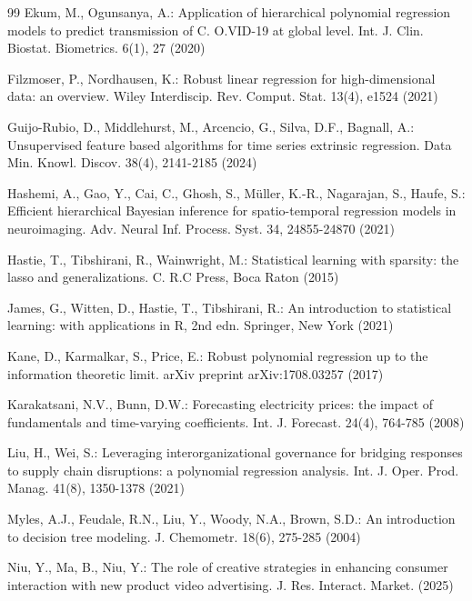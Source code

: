 \documentclass[smallextended,referee,envcountsect,,numbers]{svjour3}
\begin{document}
\begin{thebibliography}{99}
	 Ekum, M., Ogunsanya, A.: Application of hierarchical polynomial regression models to predict transmission of C. O.VID-19 at global level. Int. J. Clin. Biostat. Biometrics. 6(1), 27 (2020)
	
	 Filzmoser, P., Nordhausen, K.: Robust linear regression for high-dimensional data: an overview. Wiley Interdiscip. Rev. Comput. Stat. 13(4), e1524 (2021)
	
	 Guijo-Rubio, D., Middlehurst, M., Arcencio, G., Silva, D.F., Bagnall, A.: Unsupervised feature based algorithms for time series extrinsic regression. Data Min. Knowl. Discov. 38(4), 2141-2185 (2024)
	
	 Hashemi, A., Gao, Y., Cai, C., Ghosh, S., Müller, K.-R., Nagarajan, S., Haufe, S.: Efficient hierarchical Bayesian inference for spatio-temporal regression models in neuroimaging. Adv. Neural Inf. Process. Syst. 34, 24855-24870 (2021)
	
	 Hastie, T., Tibshirani, R., Wainwright, M.: Statistical learning with sparsity: the lasso and generalizations. C. R.C Press, Boca Raton (2015)
	
	 James, G., Witten, D., Hastie, T., Tibshirani, R.:  An introduction to statistical learning: with applications in R, 2nd edn. Springer, New York (2021)
	
	 Kane, D., Karmalkar, S., Price, E.: Robust polynomial regression up to the information theoretic limit. arXiv preprint arXiv:1708.03257 (2017)
	
	 Karakatsani, N.V., Bunn, D.W.: Forecasting electricity prices: the impact of fundamentals and time-varying coefficients. Int. J. Forecast. 24(4), 764-785 (2008)
	
	 Liu, H., Wei, S.: Leveraging interorganizational governance for bridging responses to supply chain disruptions: a polynomial regression analysis. Int. J. Oper. Prod. Manag. 41(8), 1350-1378 (2021)
	
	 Myles, A.J., Feudale, R.N., Liu, Y., Woody, N.A., Brown, S.D.: An introduction to decision tree modeling. J. Chemometr. 18(6), 275-285 (2004)
	
	 Niu, Y., Ma, B., Niu, Y.: The role of creative strategies in enhancing consumer interaction with new product video advertising. J. Res. Interact. Market.  (2025)
	

\end{thebibliography}
\end{document}
